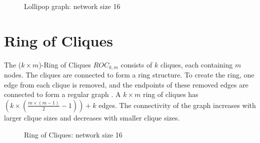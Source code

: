 \begin{figure}[H]
    \centering
    \scalebox{1}{}
    \caption{Lollipop graph: network size 16}
    \label{fig:lollipopgraphDemo}
\end{figure}

\section{Ring of Cliques}\label{sec:2ringofcliquegraph}
The ($k \times m$)-Ring of Cliques $ROC_{k,m}$ consists of $k$ cliques, each containing $m$ nodes. The cliques are connected to form a ring structure. To create the ring, one edge from each clique is removed, and the endpoints of these removed edges are connected to form a regular graph \cite{Mahlmann2010}. A $k \times m$ ring of cliques has $\left( k\times \left(\frac{m\times (m - 1)}{2}-1 \right) \right)+k$ edges. The connectivity of the graph increases with larger clique sizes and decreases with smaller clique sizes.

\begin{figure}[H]
    \centering
    \scalebox{1}{}
    \caption{Ring of Cliques: network size 16}
    \label{fig:ringofcliquesDemo}
\end{figure}

